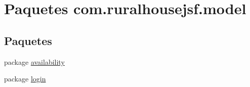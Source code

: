 \hypertarget{namespacecom_1_1ruralhousejsf_1_1model}{}\section{Paquetes com.\+ruralhousejsf.\+model}
\label{namespacecom_1_1ruralhousejsf_1_1model}
\subsection*{Paquetes}
\begin{DoxyCompactItemize}
\item 
package \mbox{\hyperlink{namespacecom_1_1ruralhousejsf_1_1model_1_1availability}{availability}}
\item 
package \mbox{\hyperlink{namespacecom_1_1ruralhousejsf_1_1model_1_1login}{login}}
\end{DoxyCompactItemize}
